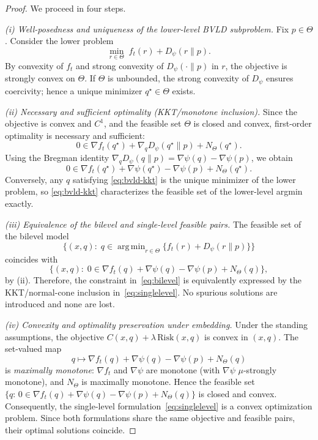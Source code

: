 \documentclass[11pt]{article}
\DeclareMathOperator*{\argmin}{arg\,min}
\theoremstyle{plain}
\theoremstyle{definition}
\theoremstyle{remark}
\begin{document}
\begin{proof}
We proceed in four steps.

\emph{(i) Well-posedness and uniqueness of the lower-level BVLD subproblem.}
Fix $p\in\Theta$. Consider the lower problem 
\[
\min_{r\in\Theta}\; f_t(r)+D_\psi(r\|p).
\]
By convexity of $f_t$ and strong convexity of $D_\psi(\cdot\|p)$ in $r$, 
the objective is strongly convex on $\Theta$.  
If $\Theta$ is unbounded, the strong convexity of $D_\psi$ ensures coercivity; 
hence a unique minimizer $q^\star\in\Theta$ exists.

\emph{(ii) Necessary and sufficient optimality (KKT/monotone inclusion).}
Since the objective is convex and $C^1$, and the feasible set $\Theta$ is closed and convex,
first-order optimality is necessary and sufficient:
\[
0\in \nabla f_t(q^\star)+\nabla_q D_\psi(q^\star\|p)+N_\Theta(q^\star).
\]
Using the Bregman identity $\nabla_q D_\psi(q\|p)=\nabla\psi(q)-\nabla\psi(p)$, 
we obtain
\begin{equation}\label{eq:bvld-kkt}
0\in\nabla f_t(q^\star)+\nabla\psi(q^\star)-\nabla\psi(p)+N_\Theta(q^\star).
\end{equation}
Conversely, any $q$ satisfying \eqref{eq:bvld-kkt} 
is the unique minimizer of the lower problem, 
so \eqref{eq:bvld-kkt} characterizes the feasible set of the lower-level argmin exactly.

\emph{(iii) Equivalence of the bilevel and single-level feasible pairs.}
The feasible set of the bilevel model
\[
\big\{(x,q):\; q\in\argmin_{r\in\Theta}\{f_t(r)+D_\psi(r\|p)\}\big\}
\]
coincides with
\[
\big\{(x,q):\; 0\in\nabla f_t(q)+\nabla\psi(q)-\nabla\psi(p)+N_\Theta(q)\big\},
\]
by (ii).  
Therefore, the constraint in~\eqref{eq:bilevel} 
is equivalently expressed by the KKT/normal-cone inclusion 
in~\eqref{eq:singlelevel}.  
No spurious solutions are introduced and none are lost.

\emph{(iv) Convexity and optimality preservation under embedding.}
Under the standing assumptions, 
the objective $C(x,q)+\lambda\,\mathrm{Risk}(x,q)$ is convex in $(x,q)$.  
The set-valued map
\[
q\mapsto\nabla f_t(q)+\nabla\psi(q)-\nabla\psi(p)+N_\Theta(q)
\]
is \emph{maximally monotone}: $\nabla f_t$ and $\nabla\psi$ are monotone 
(with $\nabla\psi$ $\mu$-strongly monotone), and $N_\Theta$ is maximally monotone.  
Hence the feasible set
\(
\{q:\,0\in\nabla f_t(q)+\nabla\psi(q)-\nabla\psi(p)+N_\Theta(q)\}
\)
is closed and convex.  
Consequently, the single-level formulation~\eqref{eq:singlelevel} 
is a convex optimization problem.  
Since both formulations share the same objective and feasible pairs, 
their optimal solutions coincide.  
\end{proof}
\end{document}
